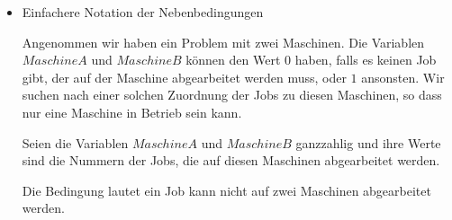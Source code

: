 \documentclass[hyperref={pdfpagelabels=false}]{beamer}
\begin{document}
\begin{frame}

	\begin{itemize}
	
	\item Einfachere Notation der Nebenbedingungen
	
	\vspace{5pt}
	{\tiny
	Angenommen wir haben ein Problem mit zwei Maschinen. Die Variablen $MaschineA$ und $MaschineB$ können den Wert $0$ haben, falls es keinen Job gibt, der auf der Maschine abgearbeitet werden muss, oder $1$ ansonsten. Wir suchen nach einer solchen Zuordnung der Jobs zu diesen Maschinen, so dass nur eine Maschine in Betrieb sein kann.\\
	}
	\vspace{5pt}
	
	\vspace{5pt}

	\pause
	
	{\tiny
	Seien die Variablen $MaschineA$ und $MaschineB$ ganzzahlig und ihre Werte sind die Nummern der Jobs, die auf diesen Maschinen abgearbeitet werden.
	
	Die Bedingung lautet \glqq ein Job kann nicht auf zwei Maschinen abgearbeitet werden\grqq.\\}
	
	\vspace{5pt}
	

\end{itemize}
\end{frame}
\end{document}
